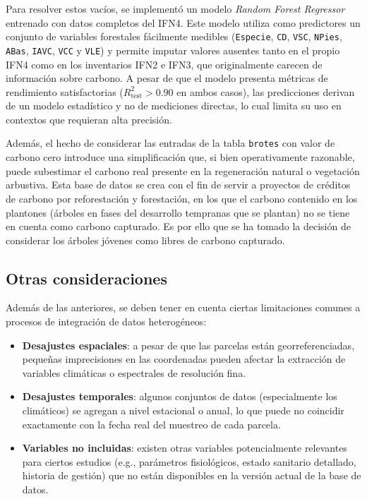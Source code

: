 \medskip

Para resolver estos vacíos, se implementó un modelo \textit{Random Forest Regressor} entrenado con datos completos del IFN4. Este modelo utiliza como predictores un conjunto de variables forestales fácilmente medibles (\texttt{Especie}, \texttt{CD}, \texttt{VSC}, \texttt{NPies}, \texttt{ABas}, \texttt{IAVC}, \texttt{VCC} y \texttt{VLE}) y permite imputar valores ausentes tanto en el propio IFN4 como en los inventarios IFN2 e IFN3, que originalmente carecen de información sobre carbono. A pesar de que el modelo presenta métricas de rendimiento satisfactorias ($R^2_{\text{test}} > 0.90$ en ambos casos), las predicciones derivan de un modelo estadístico y no de mediciones directas, lo cual limita su uso en contextos que requieran alta precisión.

\medskip

Además, el hecho de considerar las entradas de la tabla \texttt{brotes} con valor de carbono cero introduce una simplificación que, si bien operativamente razonable, puede subestimar el carbono real presente en la regeneración natural o vegetación arbustiva. Esta base de datos se crea con el fin de servir a proyectos de créditos de carbono por reforestación y forestación, en los que el carbono contenido en los plantones (árboles en fases del desarrollo tempranas que se plantan) no se tiene en cuenta como carbono capturado. Es por ello que se ha tomado la decisión de considerar los árboles jóvenes como libres de carbono capturado. 


\subsection*{Otras consideraciones}

Además de las anteriores, se deben tener en cuenta ciertas limitaciones comunes a procesos de integración de datos heterogéneos:

\begin{itemize}
    \item \textbf{Desajustes espaciales}: a pesar de que las parcelas están georreferenciadas, pequeñas imprecisiones en las coordenadas pueden afectar la extracción de variables climáticas o espectrales de resolución fina.
    
    \item \textbf{Desajustes temporales}: algunos conjuntos de datos (especialmente los climáticos) se agregan a nivel estacional o anual, lo que puede no coincidir exactamente con la fecha real del muestreo de cada parcela.
    
    \item \textbf{Variables no incluidas}: existen otras variables potencialmente relevantes para ciertos estudios (e.g., parámetros fisiológicos, estado sanitario detallado, historia de gestión) que no están disponibles en la versión actual de la base de datos.
\end{itemize}

